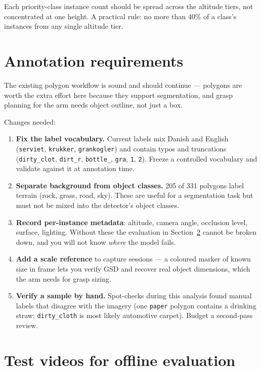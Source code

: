 \documentclass[11pt,a4paper]{article}
\newcommand{\gap}[1]{\textcolor{warn}{\textbf{#1}}}
\begin{document}
Each priority-class instance count should be spread across the altitude tiers,
not concentrated at one height. A practical rule: no more than 40\% of a class's
instances from any single altitude tier.

\section{Annotation requirements}

The existing polygon workflow is sound and should continue --- polygons are worth
the extra effort here because they support segmentation, and grasp planning for
the arm needs object outline, not just a box.

Changes needed:

\begin{enumerate}[leftmargin=*,itemsep=2pt]
\item \gap{Fix the label vocabulary.} Current labels mix Danish and English
(\texttt{serviet}, \texttt{krukker}, \texttt{grankogler}) and contain typos and
truncations (\texttt{dirty\_clot}, \texttt{dirt\_r}, \texttt{bottle\_},
\texttt{gra}, \texttt{1}, \texttt{2}). Freeze a controlled vocabulary and
validate against it at annotation time.

\item \gap{Separate background from object classes.} 205 of 331 polygons label
terrain (rock, grass, road, sky). These are useful for a segmentation task but
must not be mixed into the detector's object classes.

\item \textbf{Record per-instance metadata}: altitude, camera angle, occlusion
level, surface, lighting. Without these the evaluation in Section~\ref{sec:test}
cannot be broken down, and you will not know \emph{where} the model fails.

\item \textbf{Add a scale reference} to capture sessions --- a coloured marker of
known size in frame lets you verify GSD and recover real object dimensions,
which the arm needs for grasp sizing.

\item \textbf{Verify a sample by hand.} Spot-checks during this analysis found
manual labels that disagree with the imagery (one \texttt{paper} polygon
contains a drinking straw; \texttt{dirty\_cloth} is most likely automotive
carpet). Budget a second-pass review.
\end{enumerate}

\section{Test videos for offline evaluation}
\label{sec:test}
\end{document}
